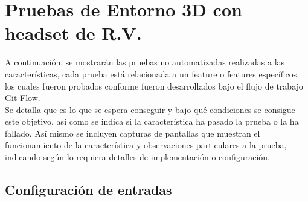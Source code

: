 \section{Pruebas de Entorno 3D con headset de R.V.}
A continuación, se mostrarán las pruebas no automatizadas realizadas a las características, cada prueba está relacionada a un feature o features específicos, los cuales fueron probados conforme fueron desarrollados bajo el flujo de trabajo Git Flow\cite{pathania2017elements}.\\ 

Se detalla que es lo que se espera conseguir y bajo qué condiciones se consigue este objetivo, así como se indica si la característica ha pasado la prueba o la ha fallado. Así mismo se incluyen capturas de pantallas que muestran el funcionamiento de la característica y observaciones particulares a la prueba, indicando según lo requiera detalles de implementación o configuración.\\

\subsection{Configuración de entradas}


